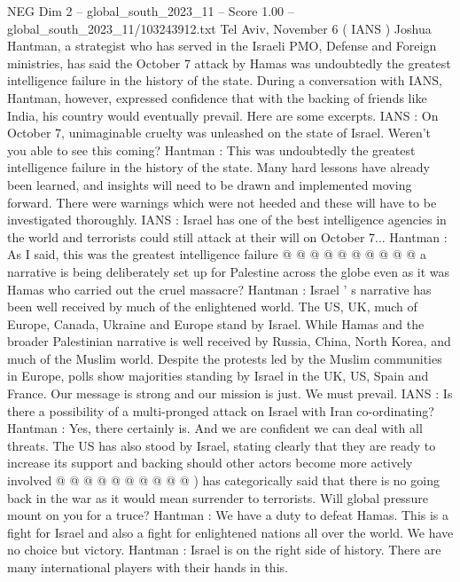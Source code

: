 \begin{textsample}{NEG Dim 2 – global\_south\_2023\_11 – Score 1.00 – global\_south\_2023\_11/103243912.txt}  \label{ex:f2_neg_355}
Tel Aviv, November 6 ( IANS ) Joshua Hantman, a strategist who has served in the Israeli PMO, Defense and Foreign ministries, has said the October 7 attack by Hamas was undoubtedly the greatest intelligence failure in the history of the state.
During a conversation with IANS, Hantman, however, expressed confidence that with the backing of friends like India, his country would eventually prevail.
Here are some excerpts.
IANS : On October 7, unimaginable cruelty was unleashed on the state of Israel.
Weren't you able to see this coming?
Hantman : This was undoubtedly the greatest intelligence failure in the history of the state.
Many hard lessons have already been learned, and insights will need to be drawn and implemented moving forward.
There were warnings which were not heeded and these will have to be investigated thoroughly.
IANS : Israel has one of the best intelligence agencies in the world and terrorists could still attack at their will on October 7...
Hantman : As I said, this was the greatest intelligence failure @ @ @ @ @ @ @ @ @ @ a narrative is being deliberately set up for Palestine across the globe even as it was Hamas who carried out the cruel massacre?
Hantman : Israel ' s narrative has been well received by much of the enlightened world.
The US, UK, much of Europe, Canada, Ukraine and Europe stand by Israel.
While Hamas and the broader Palestinian narrative is well received by Russia, China, North Korea, and much of the Muslim world.
Despite the protests led by the Muslim communities in Europe, polls show majorities standing by Israel in the UK, US, Spain and France.
Our message is strong and our mission is just.
We must prevail.
IANS : Is there a possibility of a multi-pronged attack on Israel with Iran co-ordinating?
Hantman : Yes, there certainly is.
And we are confident we can deal with all threats.
The US has also stood by Israel, stating clearly that they are ready to increase its support and backing should other actors become more actively involved @ @ @ @ @ @ @ @ @ @ ) has categorically said that there is no going back in the war as it would mean surrender to terrorists.
Will global pressure mount on you for a truce?
Hantman : We have a duty to defeat Hamas.
This is a fight for Israel and also a fight for enlightened nations all over the world.
We have no choice but victory.
Hantman : Israel is on the right side of history.
There are many international players with their hands in this.

\end{textsample}
